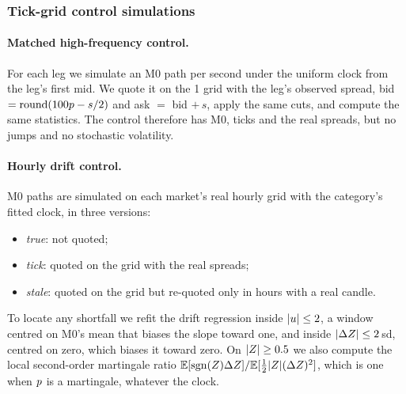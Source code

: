 \subsubsection{Tick-grid control simulations}\label{sec:dyn-control}

\paragraph{Matched high-frequency control.}
For each leg we simulate an M0 path per second under the uniform clock from the leg's first mid. We
quote it on the 1\cents{} grid with the leg's observed spread, bid
$=\operatorname{round}(100p-s/2)$\cents{} and ask $=$ bid $+\,s$, apply the same cuts, and compute
the same statistics. The control therefore has M0, ticks and the real spreads, but no jumps and no
stochastic volatility.

\paragraph{Hourly drift control.}
M0 paths are simulated on each market's real hourly grid with the category's fitted clock, in three
versions:
\begin{itemize}
\item \emph{true}: not quoted;
\item \emph{tick}: quoted on the grid with the real spreads;
\item \emph{stale}: quoted on the grid but re-quoted only in hours with a real candle.
\end{itemize}
To locate any shortfall we refit the drift regression inside $|u|\le2$, a window centred on M0's
mean that biases the slope toward one, and inside $|\Delta Z|\le2$\,sd, centred on zero, which
biases it toward zero. On $|Z|\ge0.5$ we also compute the local second-order martingale ratio
$\mathbb{E}[\operatorname{sgn}(Z)\Delta Z]/\mathbb{E}[\tfrac12|Z|(\Delta Z)^2]$, which is one when $p$ is a martingale,
whatever the clock.
